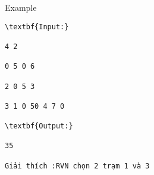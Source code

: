 Example
\begin{verbatim}
\textbf{Input:}

4 2

0 5 0 6

2 0 5 3

3 1 0 50 4 7 0

\textbf{Output:}

35

Giải thích :RVN chọn 2 trạm 1 và 3\end{verbatim}